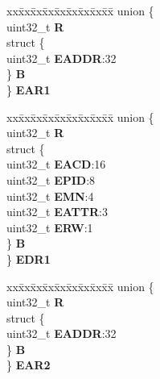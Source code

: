 \begin{DoxyCompactItemize}
\begin{tabbing}
\end{tabbing}\item 
\mbox{\label{structMPU__tag_aed1a36ddd1ab32f832891203c6f8a644}} 
\begin{tabbing}
xx\=xx\=xx\=xx\=xx\=xx\=xx\=xx\=xx\=\kill
union \{\\
\>uint32\_t {\bfseries R}\\
\>struct \{\\
\>\>uint32\_t {\bfseries EADDR}:32\\
\>\} {\bfseries B}\\
\} {\bfseries EAR1}\\

\end{tabbing}\item 
\mbox{\label{structMPU__tag_a9e8c03a0fbf07eb98d9295ff92e8f204}} 
\begin{tabbing}
xx\=xx\=xx\=xx\=xx\=xx\=xx\=xx\=xx\=\kill
union \{\\
\>uint32\_t {\bfseries R}\\
\>struct \{\\
\>\>uint32\_t {\bfseries EACD}:16\\
\>\>uint32\_t {\bfseries EPID}:8\\
\>\>uint32\_t {\bfseries EMN}:4\\
\>\>uint32\_t {\bfseries EATTR}:3\\
\>\>uint32\_t {\bfseries ERW}:1\\
\>\} {\bfseries B}\\
\} {\bfseries EDR1}\\

\end{tabbing}\item 
\mbox{\label{structMPU__tag_acc350ad1c5311e4972692a109a1b4b8d}} 
\begin{tabbing}
xx\=xx\=xx\=xx\=xx\=xx\=xx\=xx\=xx\=\kill
union \{\\
\>uint32\_t {\bfseries R}\\
\>struct \{\\
\>\>uint32\_t {\bfseries EADDR}:32\\
\>\} {\bfseries B}\\
\} {\bfseries EAR2}\\


\end{tabbing}
\end{DoxyCompactItemize}
